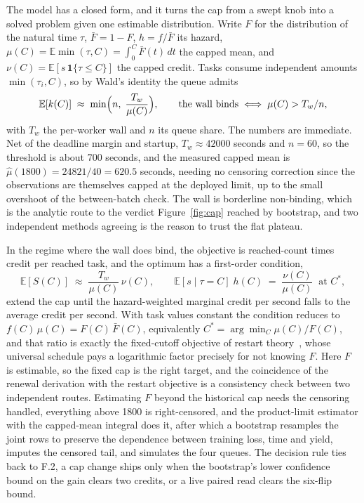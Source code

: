 \documentclass[11pt]{article}
\begin{document}
The model has a closed form, and it turns the cap from a swept knob into a solved
problem given one estimable distribution. Write $F$ for the distribution of the natural time $\tau$,
$\bar F = 1 - F$, $h = f/\bar F$ its hazard, $\mu(C) = \mathbb{E}\min(\tau, C) = \int_0^C \bar F(t)\,dt$
the capped mean, and $\nu(C) = \mathbb{E}[s\,\mathbf{1}\{\tau \le C\}]$ the capped credit. Tasks consume
independent amounts $\min(\tau_i, C)$, so by Wald's identity the queue admits
\begin{equation}
\mathbb{E}[k(C)] \;\approx\; \min\Bigl(n,\; \frac{T_w}{\mu(C)}\Bigr),
\qquad \text{the wall binds} \iff \mu(C) > T_w / n,
\label{eq:binding}
\end{equation}
with $T_w$ the per-worker wall and $n$ its queue share. The numbers are immediate. Net of the deadline
margin and startup, $T_w \approx 42000$ seconds and $n = 60$, so the threshold is about 700 seconds,
and the measured capped mean is $\hat\mu(1800) = 24821/40 = 620.5$ seconds, needing no censoring
correction since the observations are themselves capped at the deployed limit, up to the small
overshoot of the between-batch check. The wall is borderline non-binding, which is the analytic route
to the verdict Figure~\ref{fig:cap} reached by bootstrap, and two independent methods agreeing is the
reason to trust the flat plateau.

In the regime where the wall does bind, the objective is reached-count times credit per reached task,
and the optimum has a first-order condition,
\begin{equation}
\mathbb{E}[S(C)] \;\approx\; \frac{T_w}{\mu(C)}\,\nu(C),
\qquad
\mathbb{E}[s \mid \tau = C]\;h(C) \;=\; \frac{\nu(C)}{\mu(C)} \;\;\text{at } C^\ast,
\label{eq:foc}
\end{equation}
extend the cap until the hazard-weighted marginal credit per second falls to the average credit per
second. With task values constant the condition reduces to $f(C)\,\mu(C) = F(C)\,\bar F(C)$,
equivalently $C^\ast = \arg\min_C \mu(C)/F(C)$, and that ratio is exactly the fixed-cutoff objective of
restart theory~\cite{luby1993}, whose universal schedule pays a logarithmic factor precisely for not
knowing $F$. Here $F$ is estimable, so the fixed cap is the right target, and the coincidence of the
renewal derivation with the restart objective is a consistency check between two independent routes.
Estimating $F$ beyond the historical cap needs the censoring handled, everything above 1800 is
right-censored, and the product-limit estimator with the capped-mean integral does it, after which a
bootstrap resamples the joint rows to preserve the dependence between training loss, time and yield,
imputes the censored tail, and simulates the four queues. The decision rule ties back to F.2, a cap
change ships only when the bootstrap's lower confidence bound on the gain clears two credits, or a live
paired read clears the six-flip bound.
\end{document}
